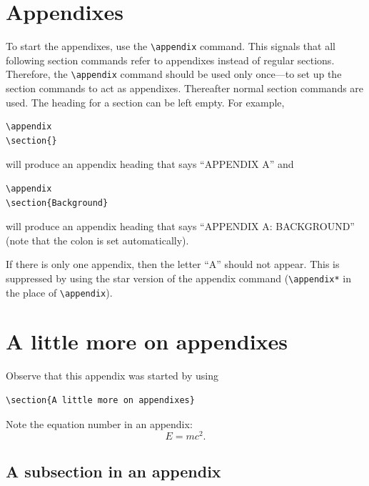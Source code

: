 \documentclass[%
 aip,
 amsmath,amssymb,
reprint, onecolumn %
]{revtex4-1}
\begin{document}
\appendix

\section{Appendixes}

To start the appendixes, use the \verb+\appendix+ command.
This signals that all following section commands refer to appendixes
instead of regular sections. Therefore, the \verb+\appendix+ command
should be used only once---to set up the section commands to act as
appendixes. Thereafter normal section commands are used. The heading
for a section can be left empty. For example,
\begin{verbatim}
\appendix
\section{}
\end{verbatim}
will produce an appendix heading that says ``APPENDIX A'' and
\begin{verbatim}
\appendix
\section{Background}
\end{verbatim}
will produce an appendix heading that says ``APPENDIX A: BACKGROUND''
(note that the colon is set automatically).

If there is only one appendix, then the letter ``A'' should not
appear. This is suppressed by using the star version of the appendix
command (\verb+\appendix*+ in the place of \verb+\appendix+).

\section{A little more on appendixes}

Observe that this appendix was started by using
\begin{verbatim}
\section{A little more on appendixes}
\end{verbatim}

Note the equation number in an appendix:
\begin{equation}
E=mc^2.
\end{equation}

\subsection{\label{app:subsec}A subsection in an appendix}
\end{document}
